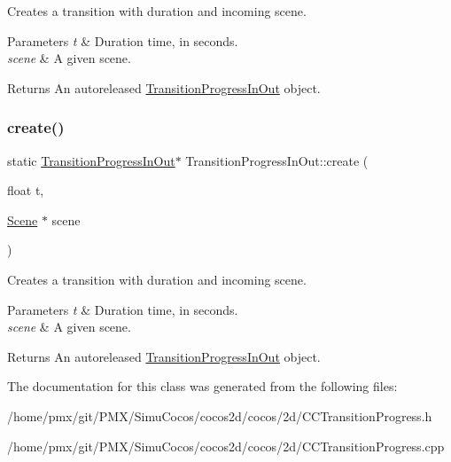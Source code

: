 Creates a transition with duration and incoming scene.


\begin{DoxyParams}{Parameters}
{\em t} & Duration time, in seconds. \\
\hline
{\em scene} & A given scene. \\
\hline
\end{DoxyParams}
\begin{DoxyReturn}{Returns}
An autoreleased \hyperlink{classTransitionProgressInOut}{Transition\+Progress\+In\+Out} object. 
\end{DoxyReturn}
\mbox{\label{classTransitionProgressInOut_a509a1c0991a128da4918dc94c92ad77b}} 
\subsubsection{\texorpdfstring{create()}{create()}\hspace{0.1cm}{\footnotesize\ttfamily [2/2]}}
{\footnotesize\ttfamily static \hyperlink{classTransitionProgressInOut}{Transition\+Progress\+In\+Out}$\ast$ Transition\+Progress\+In\+Out\+::create (\begin{DoxyParamCaption}\item[{float}]{t,  }\item[{\hyperlink{classScene}{Scene} $\ast$}]{scene }\end{DoxyParamCaption})\hspace{0.3cm}{\ttfamily [static]}}

Creates a transition with duration and incoming scene.


\begin{DoxyParams}{Parameters}
{\em t} & Duration time, in seconds. \\
\hline
{\em scene} & A given scene. \\
\hline
\end{DoxyParams}
\begin{DoxyReturn}{Returns}
An autoreleased \hyperlink{classTransitionProgressInOut}{Transition\+Progress\+In\+Out} object. 
\end{DoxyReturn}


The documentation for this class was generated from the following files\+:\begin{DoxyCompactItemize}
\item 
/home/pmx/git/\+P\+M\+X/\+Simu\+Cocos/cocos2d/cocos/2d/C\+C\+Transition\+Progress.\+h\item 
/home/pmx/git/\+P\+M\+X/\+Simu\+Cocos/cocos2d/cocos/2d/C\+C\+Transition\+Progress.\+cpp\end{DoxyCompactItemize}
